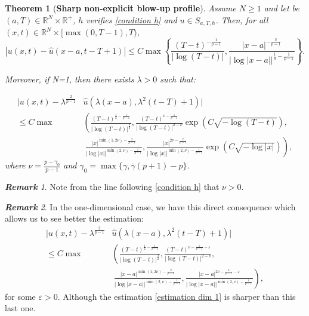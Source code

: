 \documentclass[11pt,a4paper]{article}
\newcommand{\1}{\mathbbm{1}}
\numberwithin{equation}{section}
\newcommand{\numberset}{\mathbb}
\newcommand{\R}{\numberset{R}}
\newtheorem{theorem}{Theorem}
\theoremstyle{remark}
\newtheorem*{remark}{\textbf{Remark}}
\begin{document}
\begin{theorem}[\textbf{Sharp non-explicit blow-up profile}]\label{Thm: ch1}
Assume $N\geq 1$ and let be $(a,T)\in \R^N\times \R^+$, $h$ verifies \eqref{condition h} and $u\in S_{a,T,h}$. Then, for all $(x,t)\in \R^N\times [\max(0,T-1), T)$,
\begin{equation}\label{estimation dim N}
|u(x,t)-\hat u(x-a,t-T+1)|\leq C \max \left\{\frac{(T-t)^{-\frac{1}{p-1}}}{|\log(T-t)|}, \frac{|x-a|^{-\frac{2}{p-1}}}{|\log|x-a||^{\frac{1}{4}-\frac{1}{p-1}}} \right\}.
\end{equation}

Moreover, if N=1, then there exists $\lambda>0$ such that:

\begin{equation}\label{estimation dim 1}
\begin{split}
|u(x,t)-\lambda^{\frac{2}{p-1}}&\hat{u}(\lambda (x-a),\lambda^2(t-T)+1)|\\
\leq C \max&\left(\frac{(T-t)^{\frac{1}{2}-\frac{1}{p-1}}}{|\log(T-t)|^{\frac{3}{2}}}, \frac{(T-t)^{\nu-\frac{1}{p-1}}}{|\log(T-t)|^{2-\nu}}\exp\left(C\sqrt{-\log(T-t)}\right),\right.\\
&\ \left.\frac{|x|^{\min(1,2\nu)-\frac{2}{p-1}}}{|\log |x||^{\min(2,\nu)-\frac{1}{p-1}}}, \frac{|x|^{2\nu-\frac{2}{p-1}}}{|\log |x||^{\min(2,\nu)-\frac{1}{p-1}}}\exp\left(C\sqrt{-\log |x|}\right)\right),
\end{split}
\end{equation}
where $\nu=\frac{p-\gamma_0}{p-1}$ and $\gamma_0=\max\{\gamma,\overline{\gamma}(p+1)-p\}$.
\end{theorem}
\begin{remark}
    Note from the line following \eqref{condition h} that $\nu>0$.
\end{remark}
\begin{remark}
In the one-dimensional case, we have this direct consequence which allows us to see better the estimation: 
\begin{equation*}
\begin{split}
|u(x,t)-\lambda^{\frac{2}{p-1}}&
\hat{u}(\lambda (x-a),\lambda^2(t-T)+1)|\\
\leq C \max&\left(\frac{(T-t)^{\frac{1}{2}-\frac{1}{p-1}}}{|\log(T-t)|^{\frac{3}{2}}}, \frac{(T-t)^{\nu-\frac{1}{p-1}-\varepsilon}}{|\log(T-t)|^{2-\nu}},\right.\\
&\ \left.\frac{|x-a|^{\min(1,2\nu)-\frac{2}{p-1}}}{|\log |x-a||^{\min(2,\nu)-\frac{1}{p-1}}}, \frac{|x-a|^{2\nu-\frac{2}{p-1}-\varepsilon}}{|\log |x-a||^{\min(2,\nu)-\frac{1}{p-1}}}\right),
\end{split}
\end{equation*}
for some $\varepsilon>0$. Although the estimation \eqref{estimation dim 1} is sharper than this last one.
\end{remark}
\end{document}
